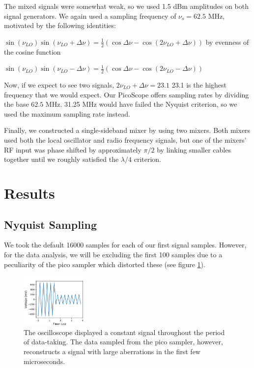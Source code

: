 \documentclass[a4paper]{article}
\begin{document}
The mixed signals were somewhat weak, so we used 1.5 dBm amplitudes on both signal generators. We again used a sampling frequency of $\nu_s = 62.5$ MHz, motivated by the following identities:

$\sin(\nu_{LO}) \sin(\nu_{LO} + \Delta \nu) = \frac{1}{2} (\cos \Delta \nu - \cos (2\nu_{LO} + \Delta \nu))$ by evenness of the cosine function

$\sin(\nu_{LO}) \sin(\nu_{LO} - \Delta \nu) = \frac{1}{2} (\cos \Delta \nu - \cos (2\nu_{LO} - \Delta \nu))$

Now, if we expect to see two signals, $2\nu_{LO} + \Delta \nu = 23.1$ 23.1 is the highest frequency that we would expect. Our PicoScope offers sampling rates by dividing the base $62.5$ MHz. 31.25 MHz would have failed the Nyquist criterion, so we used the maximum sampling rate instead. 

Finally, we constructed a single-sideband mixer by using two mixers. Both mixers used both the local oscillator and radio frequency signals, but one of the mixers' RF input was phase shifted by approximately $\pi / 2$ by linking smaller cables together until we roughly satisfied the $\lambda / 4$ criterion.


\section{Results}

\subsection{Nyquist Sampling}


\quad \quad We took the default 16000 samples for each of our first signal samples. However, for the data analysis, we will be excluding the first 100 samples due to a peculiarity of the pico sampler which distorted these (see figure \ref{fig:pico_start}).


\begin{figure}
\centering
\includegraphics[width=0.3\textwidth]{5-2/pico_bad}
\caption{The oscilloscope displayed a constant signal throughout the period of data-taking. The data sampled from the pico sampler, however, reconstructs a signal with large aberrations in the first few microseconds.}
\label{fig:pico_start}
\end{figure}
\end{document}

